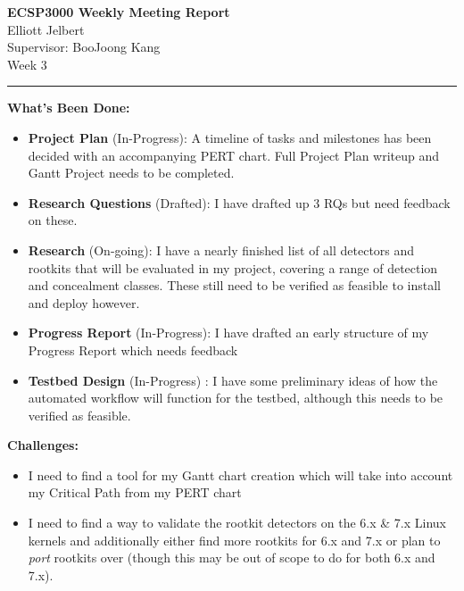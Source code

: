 \documentclass[5pt]{article}
\begin{document}

\begin{center}
    {\Large \textbf{ECSP3000 Weekly Meeting Report}} \\[1em] 
    Elliott Jelbert \\ 
    Supervisor: BooJoong Kang \\[0.5em]
    
    Week 3
    
    \vspace{1em} 
    
    \rule{\textwidth}{1pt}
\end{center}

\vspace{1.5em} 


\noindent \textbf{\large What's Been Done:}
\begin{itemize}[label=$\bullet$]
    \item \textbf{Project Plan} (In-Progress): A timeline of tasks and milestones has been decided with an accompanying PERT chart. Full Project Plan writeup and Gantt Project needs to be completed. \\
    \item \textbf{Research Questions} (Drafted): I have drafted up 3 RQs but need feedback on these. \\
    \item \textbf{Research} (On-going): I have a nearly finished list of all detectors and rootkits that will be evaluated in my project, covering a range of detection and concealment classes. These still need to be verified as feasible to install and deploy however. \\
    \item \textbf{Progress Report} (In-Progress): I have drafted an early structure of my Progress Report which needs feedback \\
    \item \textbf{Testbed Design} (In-Progress) : I have some preliminary ideas of how the automated workflow will function for the testbed, although this needs to be verified as feasible.
\end{itemize}

\vspace{2em} 

\noindent \textbf{\large Challenges:}
\begin{itemize}[label=$\bullet$]
    \item I need to find a tool for my Gantt chart creation which will take into account my Critical Path from my PERT chart
    \item I need to find a way to validate the rootkit detectors on the 6.x \& 7.x Linux kernels and additionally either find more rootkits for 6.x and 7.x or plan to \textit{port} rootkits over (though this may be out of scope to do for both 6.x and 7.x).
\end{itemize}
\end{document}
